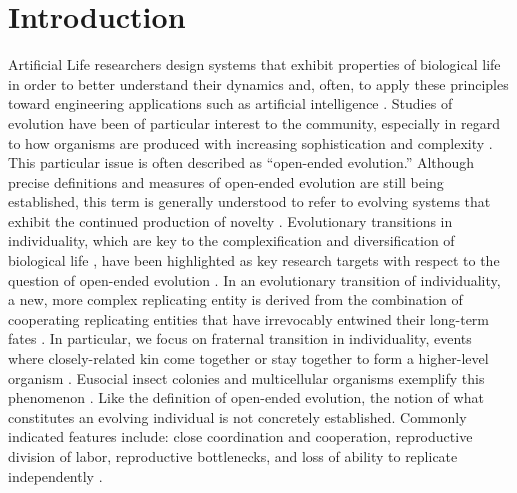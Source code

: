 \section{Introduction}

Artificial Life researchers design systems that exhibit properties of biological life in order to better understand their dynamics and, often, to apply these principles toward engineering applications such as artificial intelligence \citep{bedau2003artificial}.
Studies of evolution have been of particular interest to the community, especially in regard to how organisms are produced with increasing sophistication and complexity \citep{goldsby2017increasing}.
This particular issue is often described as ``open-ended evolution.''
Although precise definitions and measures of open-ended evolution are still being established, this term is generally understood to refer to evolving systems that exhibit the continued production of novelty \citep{taylor2016open}.
Evolutionary transitions in individuality, which are key to the complexification and diversification of biological life \citep{smith1997major}, have been highlighted as key research targets with respect to the question of open-ended evolution \citep{ray1996evolving, banzhaf2016defining}.
In an evolutionary transition of individuality, a new, more complex replicating entity is derived from the combination of cooperating replicating entities that have irrevocably entwined their long-term fates \citep{west2015major}.
In particular, we focus on fraternal transition in individuality, events where closely-related kin come together or stay together to form a higher-level organism \cite{queller1997cooperators}.
Eusocial insect colonies and multicellular organisms exemplify this phenomenon \citep{smith1997major}.
Like the definition of open-ended evolution, the notion of what constitutes an evolving individual is not concretely established.
Commonly indicated features include:
close coordination and cooperation, reproductive division of labor, reproductive bottlenecks, and loss of ability to replicate independently
\citep{ereshefsky2015rethinking, bouchard2013symbiotic}.

